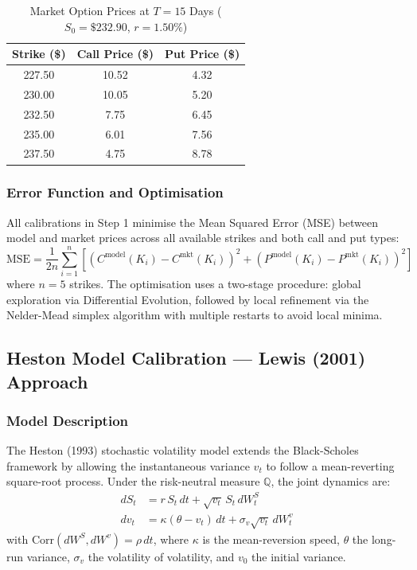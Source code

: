 \documentclass[12pt,a4paper]{article}
\newcommand{\thead}[1]{\cellcolor{headernavy}\color{white}\textbf{#1}}
\newcommand{\rowA}{\rowcolor{white}}
\newcommand{\rowB}{\rowcolor{rowgray}}
\begin{document}
\begin{table}[H]
  \centering
  \caption{Market Option Prices at $T = 15$ Days ($S_0 = \$232.90$, $r = 1.50\%$)}
  \label{tab:market_data_15d}
  \begin{tabular}{ccc}
    \hline
    \thead{Strike (\$)} & \thead{Call Price (\$)} & \thead{Put Price (\$)} \\
    \hline
    \rowA 227.50 & 10.52 & 4.32 \\
    \rowB 230.00 & 10.05 & 5.20 \\
    \rowA 232.50 &  7.75 & 6.45 \\
    \rowB 235.00 &  6.01 & 7.56 \\
    \rowA 237.50 &  4.75 & 8.78 \\
    \hline
  \end{tabular}
\end{table}

\subsubsection{Error Function and Optimisation}

All calibrations in Step 1 minimise the Mean Squared Error (MSE) between model and market prices across all available strikes and both call and put types:
\[
  \text{MSE} = \frac{1}{2n}\sum_{i=1}^{n}\left[\left(C^{\text{model}}(K_i) - C^{\text{mkt}}(K_i)\right)^2 + \left(P^{\text{model}}(K_i) - P^{\text{mkt}}(K_i)\right)^2\right]
\]
where $n = 5$ strikes. The optimisation uses a two-stage procedure: global exploration via Differential Evolution, followed by local refinement via the Nelder-Mead simplex algorithm with multiple restarts to avoid local minima.

\subsection{Heston Model Calibration --- Lewis (2001) Approach}
\label{sec:step1a}

\subsubsection{Model Description}

The Heston (1993) stochastic volatility model extends the Black-Scholes framework by allowing the instantaneous variance $v_t$ to follow a mean-reverting square-root process. Under the risk-neutral measure $\mathbb{Q}$, the joint dynamics are:
\begin{align}
  dS_t &= r\,S_t\,dt + \sqrt{v_t}\,S_t\,dW_t^S \\
  dv_t &= \kappa(\theta - v_t)\,dt + \sigma_v\sqrt{v_t}\,dW_t^v
\end{align}
with $\text{Corr}(dW^S, dW^v) = \rho\,dt$, where $\kappa$ is the mean-reversion speed, $\theta$ the long-run variance, $\sigma_v$ the volatility of volatility, and $v_0$ the initial variance.
\end{document}
